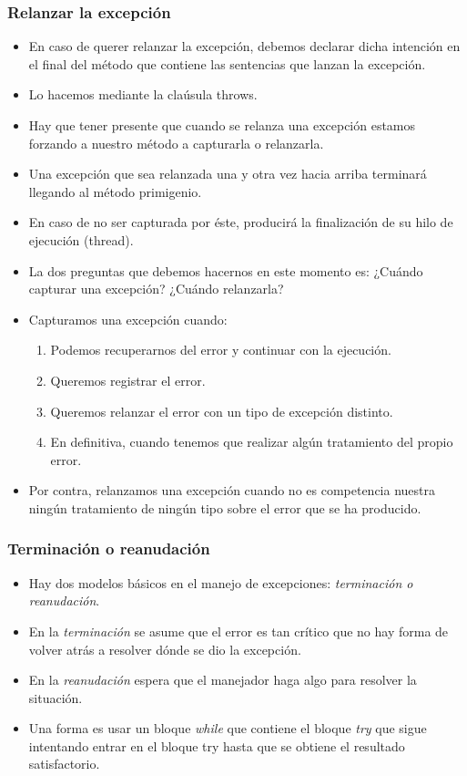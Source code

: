 \documentclass{beamer}
\begin{document}
\begin{frame}
\frametitle{Relanzar la excepción}
\begin{footnotesize}
\begin{itemize}[<+->]
\item En caso de querer relanzar la excepción, debemos declarar dicha intención en el final del método que contiene las sentencias que lanzan la excepción.
\item Lo hacemos mediante la claúsula \alert{throws}.
\item Hay que tener presente que cuando se relanza una excepción estamos forzando a nuestro método a capturarla o relanzarla.
\item Una excepción que sea relanzada una y otra vez hacia arriba terminará llegando al método primigenio.
\item En caso de no ser capturada por éste, producirá la finalización de su hilo de ejecución (thread).
\item La dos preguntas que debemos hacernos en este momento es: ¿Cuándo capturar una excepción? ¿Cuándo relanzarla?
\item Capturamos una excepción cuando:
\begin{enumerate}
\item Podemos recuperarnos del error y continuar con la ejecución.
\item Queremos registrar el error.
\item Queremos relanzar el error con un tipo de excepción distinto.
\item En definitiva, cuando tenemos que realizar algún tratamiento del propio error. 
\end{enumerate}
\item Por contra, relanzamos una excepción cuando no es competencia nuestra ningún tratamiento de ningún tipo sobre el error que se ha producido.
\end{itemize}
\end{footnotesize}
\end{frame}


\begin{frame}
\frametitle{Terminación o reanudación}
\begin{itemize}[<+->]
\item Hay dos modelos básicos en el manejo de excepciones: \emph{terminación o reanudación}.
\item En la \emph{terminación} se asume que el error es tan crítico que no hay forma de volver atrás a resolver dónde se dio la excepción.
\item En la \emph{reanudación} espera que el manejador haga algo para resolver la situación.
\item Una forma es usar un bloque \emph{while} que contiene el bloque \emph{try} que sigue intentando entrar en el bloque try hasta que se obtiene el resultado satisfactorio.
\end{itemize}
\end{frame}
\end{document}
